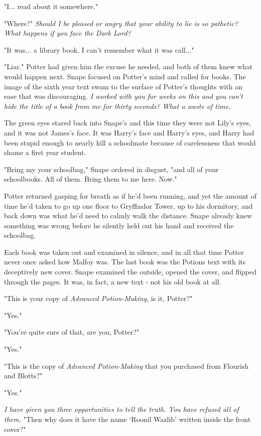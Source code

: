 "I... read about it somewhere."

"Where?" \emph{Should I be pleased or angry that your ability to lie is so pathetic? What happens if you face the Dark Lord?}

"It was... a library book. I can't remember what it was call..."

"Liar." Potter had given him the excuse he needed, and both of them knew what would happen next. Snape focused on Potter's mind and called for books. The image of the sixth year text swam to the surface of Potter's thoughts with an ease that was discouraging. \emph{I worked with you for weeks on this and you can't hide the title of a book from me for thirty seconds? What a waste of time.}

The green eyes stared back into Snape's and this time they were not Lily's eyes, and it was not James's face. It was Harry's face and Harry's eyes, and Harry had been stupid enough to nearly kill a schoolmate because of carelessness that would shame a first year student.

"Bring my your schoolbag," Snape ordered in disgust, "and all of your schoolbooks. All of them. Bring them to me here. Now."

Potter returned gasping for breath as if he'd been running, and yet the amount of time he'd taken to go up one floor to Gryffindor Tower, up to his dormitory, and back down was what he'd need to calmly walk the distance. Snape already knew something was wrong before he silently held out his hand and received the schoolbag.

Each book was taken out and examined in silence, and in all that time Potter never once asked how Malfoy was. The last book was the Potions text with its deceptively new cover. Snape examined the outside, opened the cover, and flipped through the pages. It was, in fact, a new text - not his old book at all.

"This is your copy of \emph{Advanced Potion-Making}, is it, Potter?"

"Yes."

"You're quite sure of that, are you, Potter?"

"Yes."

"This is the copy of \emph{Advanced Potion-Making} that you purchased from Flourish and Blotts?"

"Yes."

\emph{I have given you three opportunities to tell the truth. You have refused all of them.} "Then why does it have the name `Roonil Wazlib' written inside the front cover?"

